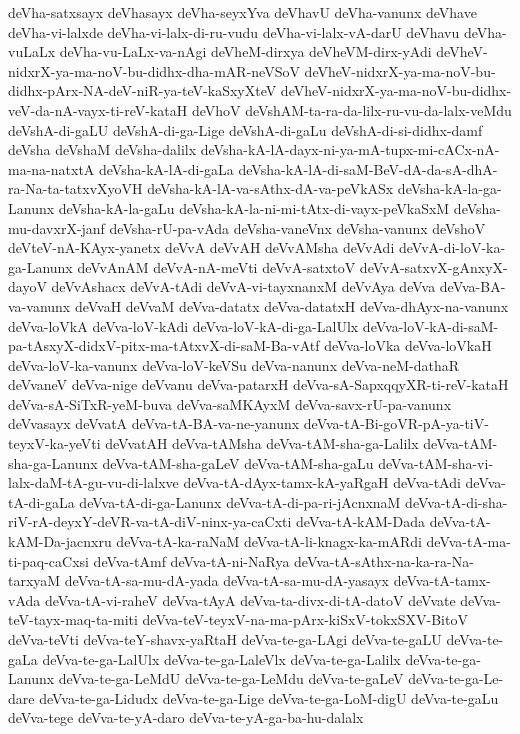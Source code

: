 {deVha-satxsayx
deVhasayx
deVha-seyxYva
deVhavU
deVha-vanunx
deVhave
deVha-vi-lalxde
deVha-vi-lalx-di-ru-vudu
deVha-vi-lalx-vA-darU
deVhavu
deVha-vuLaLx
deVha-vu-LaLx-va-nAgi
deVheM-dirxya
deVheVM-dirx-yAdi
deVheV-nidxrX-ya-ma-noV-bu-didhx-dha-mAR-neVSoV
deVheV-nidxrX-ya-ma-noV-bu-didhx-pArx-NA-deV-niR-ya-teV-kaSxyXteV
deVheV-nidxrX-ya-ma-noV-bu-didhx-veV-da-nA-vayx-ti-reV-kataH
deVhoV
deVshAM-ta-ra-da-lilx-ru-vu-da-lalx-veMdu
deVshA-di-gaLU
deVshA-di-ga-Lige
deVshA-di-gaLu
deVshA-di-si-didhx-damf
deVsha
deVshaM
deVsha-dalilx
deVsha-kA-lA-dayx-ni-ya-mA-tupx-mi-cACx-nA-ma-na-natxtA
deVsha-kA-lA-di-gaLa
deVsha-kA-lA-di-saM-BeV-dA-da-sA-dhA-ra-Na-ta-tatxvXyoVH
deVsha-kA-lA-va-sAthx-dA-va-peVkASx
deVsha-kA-la-ga-Lanunx
deVsha-kA-la-gaLu
deVsha-kA-la-ni-mi-tAtx-di-vayx-peVkaSxM
deVsha-mu-davxrX-janf
deVsha-rU-pa-vAda
deVsha-vaneVnx
deVsha-vanunx
deVshoV
deVteV-nA-KAyx-yanetx
deVvA
deVvAH
deVvAMsha
deVvAdi
deVvA-di-loV-ka-ga-Lanunx
deVvAnAM
deVvA-nA-meVti
deVvA-satxtoV
deVvA-satxvX-gAnxyX-dayoV
deVvAshacx
deVvA-tAdi
deVvA-vi-tayxnanxM
deVvAya
deVva
deVva-BA-va-vanunx
deVvaH
deVvaM
deVva-datatx
deVva-datatxH
deVva-dhAyx-na-vanunx
deVva-loVkA
deVva-loV-kAdi
deVva-loV-kA-di-ga-LalUlx
deVva-loV-kA-di-saM-pa-tAsxyX-didxV-pitx-ma-tAtxvX-di-saM-Ba-vAtf
deVva-loVka
deVva-loVkaH
deVva-loV-ka-vanunx
deVva-loV-keVSu
deVva-nanunx
deVva-neM-dathaR
deVvaneV
deVva-nige
deVvanu
deVva-patarxH
deVva-sA-SapxqqyXR-ti-reV-kataH
deVva-sA-SiTxR-yeM-buva
deVva-saMKAyxM
deVva-savx-rU-pa-vanunx
deVvasayx
deVvatA
deVva-tA-BA-va-ne-yanunx
deVva-tA-Bi-goVR-pA-ya-tiV-teyxV-ka-yeVti
deVvatAH
deVva-tAMsha
deVva-tAM-sha-ga-Lalilx
deVva-tAM-sha-ga-Lanunx
deVva-tAM-sha-gaLeV
deVva-tAM-sha-gaLu
deVva-tAM-sha-vi-lalx-daM-tA-gu-vu-di-lalxve
deVva-tA-dAyx-tamx-kA-yaRgaH
deVva-tAdi
deVva-tA-di-gaLa
deVva-tA-di-ga-Lanunx
deVva-tA-di-pa-ri-jAcnxnaM
deVva-tA-di-sha-riV-rA-deyxY-deVR-va-tA-diV-ninx-ya-caCxti
deVva-tA-kAM-Dada
deVva-tA-kAM-Da-jacnxru
deVva-tA-ka-raNaM
deVva-tA-li-knagx-ka-mARdi
deVva-tA-ma-ti-paq-caCxsi
deVva-tAmf
deVva-tA-ni-NaRya
deVva-tA-sAthx-na-ka-ra-Na-tarxyaM
deVva-tA-sa-mu-dA-yada
deVva-tA-sa-mu-dA-yasayx
deVva-tA-tamx-vAda
deVva-tA-vi-raheV
deVva-tAyA
deVva-ta-divx-di-tA-datoV
deVvate
deVva-teV-tayx-maq-ta-miti
deVva-teV-teyxV-na-ma-pArx-kiSxV-tokxSXV-BitoV
deVva-teVti
deVva-teY-shavx-yaRtaH
deVva-te-ga-LAgi
deVva-te-gaLU
deVva-te-gaLa
deVva-te-ga-LalUlx
deVva-te-ga-LaleVlx
deVva-te-ga-Lalilx
deVva-te-ga-Lanunx
deVva-te-ga-LeMdU
deVva-te-ga-LeMdu
deVva-te-gaLeV
deVva-te-ga-Le-dare
deVva-te-ga-Lidudx
deVva-te-ga-Lige
deVva-te-ga-LoM-digU
deVva-te-gaLu
deVva-tege
deVva-te-yA-daro
deVva-te-yA-ga-ba-hu-dalalx
}
